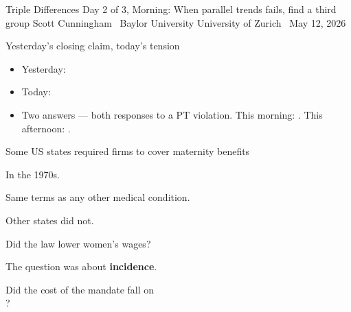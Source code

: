 \documentclass[aspectratio=169,11pt]{beamer}
\begin{document}

\remixtitleframe
  {Triple Differences}
  {Day 2 of 3, Morning: When parallel trends fails, find a third group}
  {Scott Cunningham \textperiodcentered\ Baylor University}
  {University of Zurich \textperiodcentered\ May 12, 2026}

\begin{frame}{Yesterday's closing claim, today's tension}
\vspace{0.6em}
\vspace{0.6em}
\begin{itemize}
  \item Yesterday: 
  \item Today: 
  \item Two answers --- both responses to a PT violation. This morning: . This afternoon: .
\end{itemize}
\end{frame}

\begin{frame}{Some US states required firms to cover maternity benefits}
\vspace{1.2em}
\begin{center}
\large In the 1970s.
\end{center}
\vspace{0.6em}
\begin{center}
\large Same terms as any other medical condition.
\end{center}
\vspace{0.6em}
\begin{center}
\large Other states did not.
\end{center}
\end{frame}

\begin{frame}{Did the law lower women's wages?}
\vspace{2em}
\begin{center}
\large
The question was about \textbf{incidence}.
\end{center}
\vspace{0.6em}
\begin{center}
\large
Did the cost of the mandate fall on \\[0.2em]
?
\end{center}
\end{frame}
\end{document}
